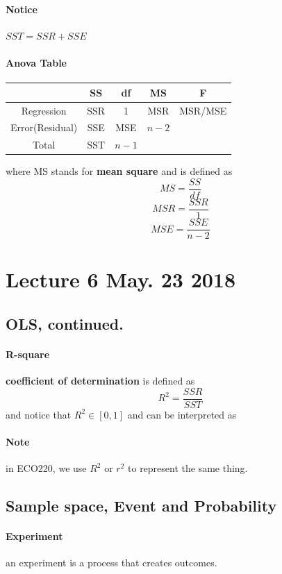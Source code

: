 \documentclass{article}
\begin{document}
		\paragraph{Notice} $SST = SSR + SSE$
		\paragraph{Anova Table}
		\begin{center}
			\begin{tabular} {|c|c|c|c|c|}
				\hline
				 & SS & df & MS & F \\
				 \hline
				 Regression & SSR & 1 & MSR & MSR/MSE \\
				 \hline
				 Error(Residual) & SSE & MSE & $n-2$ & \\
				 \hline
				 Total & SST & $n-1$ & & \\
				 \hline
			\end{tabular}
		\end{center}
		where MS stands for \textbf{mean square} and is defined as
			\[
				MS = \frac{SS}{df}
			\]
			\[
				MSR = \frac{SSR}{1}
			\]
			\[
				MSE = \frac{SSE}{n-2}
			\]
			
		\section{Lecture 6 May. 23 2018}
		\subsection{OLS, continued.}
		\paragraph{R-square} \textbf{coefficient of determination} is defined as 
			\[
				R^2 = \frac{SSR}{SST}
			\]
			and notice that $R^2 \in [0, 1]$ and can be interpreted as 
		\paragraph{Note} in ECO220, we use $R^2$ or $r^2$ to represent the same thing.
		
		\subsection{Sample space, Event and Probability}
		\paragraph{Experiment} an experiment is a process that creates  outcomes.
\end{document}
